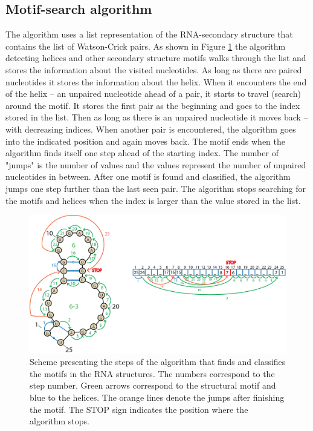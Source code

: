 \documentclass[12pt]{article}
\begin{document}
\subsection{Motif-search algorithm}
The algorithm uses a list representation of the RNA-secondary structure that contains the list of Watson-Crick pairs. As shown in Figure \ref{MotifsAlgorithm} the algorithm detecting helices and other secondary structure motifs walks through the list and stores the information about the visited nucleotides. As long as there are paired nucleotides it stores the information about the helix. When it encounters the end of the helix -- an unpaired nucleotide ahead of a pair, it starts to travel (search) around the motif. It stores the first pair as the beginning and goes to the index stored in the list. Then as long as there is an unpaired nucleotide it moves back -- with decreasing indices. When another pair is encountered, the algorithm goes into the indicated position and again moves back. The motif ends when the algorithm finds itself one step ahead of the starting index. The number of "jumps" is the number of values and the values represent the number of unpaired nucleotides in between. After one motif is found and classified, the algorithm jumps one step further than the last seen pair. The algorithm stops searching for the motifs and helices when the index is larger than the value stored in the list. 

\begin{figure}[h!]
\centering
\includegraphics[width =\textwidth]{./pictures/algorithm.png}
\caption{Scheme presenting the steps of the algorithm that finds and classifies the motifs in the RNA structures. The numbers correspond to the step number. Green arrows correspond to the structural motif and blue to the helices. The orange lines denote the jumps after finishing the motif. The STOP sign indicates the position where the algorithm stops. }
\label{MotifsAlgorithm}
\end{figure}
\end{document}
